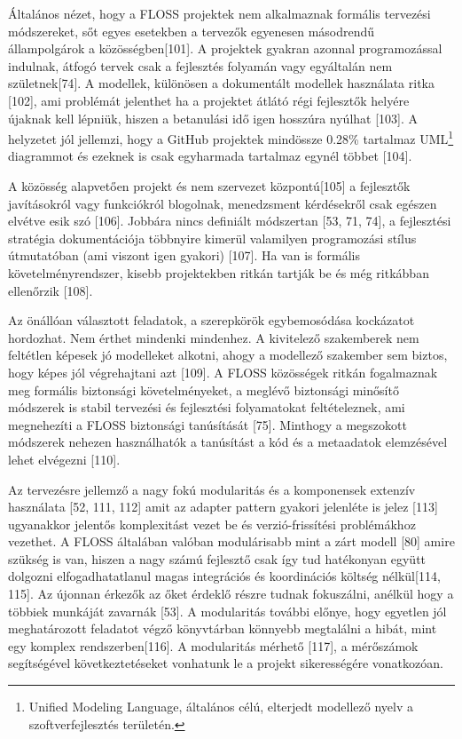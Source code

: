 \documentclass[12pt,magyar,a4paper,oneside]{scrreprt}
\begin{document}
Általános nézet, hogy a FLOSS projektek nem alkalmaznak formális
tervezési módszereket, sőt egyes esetekben a tervezők egyenesen
másodrendű állampolgárok a közösségben{[}101{]}. A projektek gyakran
azonnal programozással indulnak, átfogó tervek csak a fejlesztés
folyamán vagy egyáltalán nem születnek{[}74{]}. A modellek, különösen a
dokumentált modellek használata ritka {[}102{]}, ami problémát jelenthet
ha a projektet átlátó régi fejlesztők helyére újaknak kell lépniük,
hiszen a betanulási idő igen hosszúra nyúlhat {[}103{]}. A helyzetet jól
jellemzi, hogy a GitHub projektek mindössze 0.28\% tartalmaz
UML\footnote{Unified Modeling Language, általános célú, elterjedt
  modellező nyelv a szoftverfejlesztés területén.} diagrammot és ezeknek
is csak egyharmada tartalmaz egynél többet {[}104{]}.

A közösség alapvetően projekt és nem szervezet központú{[}105{]} a
fejlesztők javításokról vagy funkciókról blogolnak, menedzsment
kérdésekről csak egészen elvétve esik szó {[}106{]}. Jobbára nincs
definiált módszertan {[}53, 71, 74{]}, a fejlesztési stratégia
dokumentációja többnyire kimerül valamilyen programozási stílus
útmutatóban (ami viszont igen gyakori) {[}107{]}. Ha van is formális
követelményrendszer, kisebb projektekben ritkán tartják be és még
ritkábban ellenőrzik {[}108{]}.

Az önállóan választott feladatok, a szerepkörök egybemosódása kockázatot
hordozhat. Nem érthet mindenki mindenhez. A kivitelező szakemberek nem
feltétlen képesek jó modelleket alkotni, ahogy a modellező szakember sem
biztos, hogy képes jól végrehajtani azt {[}109{]}. A FLOSS közösségek
ritkán fogalmaznak meg formális biztonsági követelményeket, a meglévő
biztonsági minősítő módszerek is stabil tervezési és fejlesztési
folyamatokat feltételeznek, ami megnehezíti a FLOSS biztonsági
tanúsítását {[}75{]}. Minthogy a megszokott módszerek nehezen
használhatók a tanúsítást a kód és a metaadatok elemzésével lehet
elvégezni {[}110{]}.

Az tervezésre jellemző a nagy fokú modularitás és a komponensek extenzív
használata {[}52, 111, 112{]} amit az adapter pattern gyakori jelenléte
is jelez {[}113{]} ugyanakkor jelentős komplexitást vezet be és
verzió-frissítési problémákhoz vezethet. A FLOSS általában valóban
modulárisabb mint a zárt modell {[}80{]} amire szükség is van, hiszen a
nagy számú fejlesztő csak így tud hatékonyan együtt dolgozni
elfogadhatatlanul magas integrációs és koordinációs költség
nélkül{[}114, 115{]}. Az újonnan érkezők az őket érdeklő részre tudnak
fokuszálni, anélkül hogy a többiek munkáját zavarnák {[}53{]}. A
modularitás további előnye, hogy egyetlen jól meghatározott feladatot
végző könyvtárban könnyebb megtalálni a hibát, mint egy komplex
rendszerben{[}116{]}. A modularitás mérhető {[}117{]}, a mérőszámok
segítségével következtetéseket vonhatunk le a projekt sikerességére
vonatkozóan.
\end{document}
